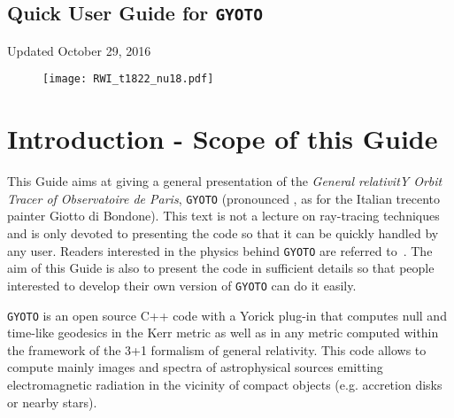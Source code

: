 \documentclass[a4paper,12pt]{article}
\begin{document}
\begin{center}
\section*{\Huge{Quick User Guide for \texttt{GYOTO}}}

\vspace{0.5cm}

\Large{Updated October 29, 2016}

\vspace{4cm}

\begin{figure}[htbp]
\centering
\texttt{[image: RWI\_t1822\_nu18.pdf]}
\end{figure}

\end{center}



\newpage

\section*{Introduction - Scope of this Guide}



This Guide aims at giving a general presentation of the \textit{General relativitY Orbit Tracer of Observatoire de Paris}, \texttt{GYOTO} (pronounced \textipa{[dZIoto]}, as for the Italian trecento painter Giotto di Bondone). This text is not a lecture on ray-tracing techniques and is only devoted to presenting the code so that it can be quickly handled by any user. Readers interested in the physics behind \texttt{GYOTO} are referred to~\citet[][and references therein]{vincent11a,vincent12a}. The aim of this Guide is also to present the code in sufficient details so that people interested to develop their own version of \texttt{GYOTO} can do it easily.

\texttt{GYOTO} is an open source C++ code with a Yorick plug-in that computes null and time-like geodesics in the Kerr metric as well as in any metric computed within the framework of the 3+1 formalism of general relativity. This code allows to compute mainly images and spectra of astrophysical sources emitting electromagnetic radiation in the vicinity of compact objects (e.g. accretion disks or nearby stars). 
\end{document}
